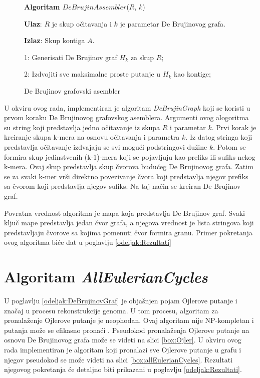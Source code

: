 \documentclass[12pt,oneside]{memoir}
\begin{document}
\begin{figure}[!ht]
\begin{tcolorbox}
\textbf{Algoritam $DeBrujinAssembler$}($R$, $k$)

\textbf{Ulaz}: $R$ je skup očitavanja i $k$ je parametar De Brujinovog grafa.

\textbf{Izlaz}: Skup kontiga $A$.

1: Generisati De Brujinov graf $H_k$ za skup $R$;

2: Izdvojiti sve maksimalne proste putanje u $H_k$ kao kontige;

\end{tcolorbox}
\caption{De Brujinov grafovski asembler \cite{WingKinSung}}
\label{box:DeBrujinAssembler}
\end{figure}

U okviru ovog rada, implementiran je algoritam \textit{DeBrujinGraph} koji se koristi u prvom koraku De Brujinovog grafovskog asemblera. Argumenti ovog alogoritma su string koji predstavlja jedno očitavanje iz skupa $R$ i parametar $k$. Prvi korak je kreiranje skupa k-mera na osnovu očitavanja i parametra $k$. Iz datog stringa koji predstavlja očitavanje izdvajaju se svi mogući podstringovi dužine $k$. Potom se formira skup jedinstvenih (k-1)-mera koji se pojavljuju kao prefiks ili sufiks nekog k-mera. Ovaj skup predstavlja skup čvorova budućeg De Brujinovog grafa. Zatim se za svaki k-mer vrši direktno povezivanje čvora koji predstavlja njegov prefiks sa čvorom koji predstavlja njegov sufiks. Na taj način se kreiran De Brujinov graf.

Povratna vrednost algoritma je mapa koja predstavlja De Brujinov graf. Svaki ključ mape predstavlja jedan čvor grafa, a njegova vrednost je lista stringova koji predstavljaju čvorove sa kojima pomenuti čvor formira granu. Primer pokretanja ovog algoritma biće dat u poglavlju \ref{odeljak:Rezultati}

\section{Algoritam \textit{AllEulerianCycles}}

U poglavlju \ref{odeljak:DeBrujinovGraf} je objašnjen pojam  Ojlerove putanje i značaj u procesu rekonstrukcije genoma. U tom procesu, algoritam za pronalaženje Ojlerove putanje je neophodan. Ovaj algoritam nije NP-kompletan i putanja može se efikasno pronaći \cite{skriptaBio}. Pseudokod pronalaženja Ojlerove putanje na osnovu De Brujinovog grafa može se videti na slici \ref{box:Ojler}. U okviru ovog rada implementiran je algoritam koji pronalazi sve Ojlerove putanje u grafu i njegov pseudokod se može videti na slici \ref{box:allEulerianCycles}. Rezultati njegovog pokretanja će detaljno biti prikazani u poglavlju \ref{odeljak:Rezultati}.
\vspace{0.2cm}
\end{document}
